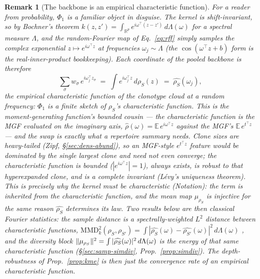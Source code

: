 \documentclass[11pt]{article}
\theoremstyle{oldplain}
\theoremstyle{oldrem}
\newtheorem{remark}{Remark}
\newcommand{\R}{\mathds{R}}  %
\newcommand{\E}{\mathds{E}}
\DeclarePairedDelimiter{\norm}{\lVert}{\rVert}
\begin{document}
\begin{remark}[The backbone is an empirical characteristic function]\label{rem:cf}
For a reader from probability, $\Phi_1$ is a familiar object in disguise. The kernel is shift-invariant, so by
\emph{Bochner's theorem} $k(z,z')=\int_{\R^{p}} e^{i\omega^\top(z-z')}\,d\Lambda(\omega)$ for a spectral measure
$\Lambda$, and the random-Fourier map of Eq.~\eqref{eq:rff} simply samples the complex exponential
$z\mapsto e^{i\omega^\top z}$ at frequencies $\omega_j\sim\Lambda$ (the $\cos(\omega^\top z+b)$ form is the
real-inner-product bookkeeping). Each coordinate of the pooled backbone is therefore
\begin{equation}\label{eq:ecf}
  \sum_\sigma w_\sigma\, e^{i\omega_j^\top z_\sigma}
  \;=\;\int e^{i\omega_j^\top z}\,d\rho_S(z)
  \;=\;\widehat{\rho_S}(\omega_j),
\end{equation}
the \emph{empirical characteristic function} of the clonotype cloud at a random frequency: $\Phi_1$ is a finite
sketch of $\rho_S$'s characteristic function. This is the moment-generating function's bounded cousin --- the
characteristic function is the {\scshape MGF} evaluated on the imaginary axis,
$\widehat{\rho}(\omega)=\E\,e^{i\omega^\top z}$ against the {\scshape MGF}'s $\E\,e^{t^\top z}$ --- and the swap is
exactly what a repertoire summary needs. Clone sizes are heavy-tailed (Zipf, \S\ref{sec:dens-abund}), so an
{\scshape MGF}-style $e^{t^\top z}$ feature would be dominated by the single largest clone and need not even
converge; the characteristic function is bounded ($|e^{i\omega^\top z}|=1$), always exists, is robust to that
hyperexpanded clone, and is a \emph{complete} invariant (L\'evy's uniqueness theorem). This is precisely why the
kernel must be \emph{characteristic} (Notation): the term is inherited from the characteristic function, and the
mean map $\mu_{\rho_S}$ is injective for the same reason $\widehat{\rho_S}$ determines its law. Two results below
are then classical Fourier statistics: the sample distance is a spectrally-weighted $L^2$ distance between
characteristic functions,
$\mathrm{MMD}_k^2(\rho_S,\rho_{S'})=\int|\widehat{\rho_S}(\omega)-\widehat{\rho_{S'}}(\omega)|^2\,d\Lambda(\omega)$
\cite{Muandet2017,Gretton2012}, and the diversity block
$\norm{\mu_{\rho_S}}^2=\int|\widehat{\rho_S}(\omega)|^2\,d\Lambda(\omega)$ is the \emph{energy} of that same
characteristic function (\S\ref{sec:samp-simdiv}, Prop.~\ref{prop:simdiv}). The depth-robustness of
Prop.~\ref{prop:kme} is then just the convergence rate of an empirical characteristic function.
\end{remark}
\end{document}
